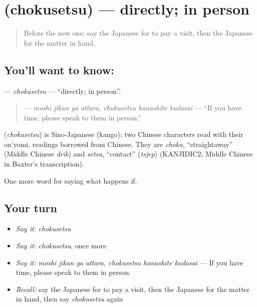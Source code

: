 \section[\texorpdfstring{\ja{ちょくせつ} (chokusetsu)}{ちょくせつ (chokusetsu)}]{ (chokusetsu) — directly; in person}

\label{lesson:JA-C347-chokusetsu}



\begin{quote}
Before the new one: say the Japanese for to pay a visit, then the Japanese for the matter in hand.
\end{quote}

\subsection*{You'll want to know: }
\textbf{} — \emph{chokusetsu} — \textquotedblleft{}directly; in person\textquotedblright{}.

\begin{quote}
\textbf{    } — \emph{moshi jikan ga attara, chokusetsu hanashite kudasai} — \textquotedblleft{}If you have time, please speak to them in person.\textquotedblright{}
\end{quote}

\begin{cousinweb}
\textbf{} (\emph{chokusetsu}) is Sino-Japanese (kango): two Chinese characters read with their on'yomi, readings borrowed from Chinese. They are \emph{choku}, \textquotedblleft{}straightaway\textquotedblright{} (Middle Chinese \emph{drik}) and \emph{setsu}, \textquotedblleft{}contact\textquotedblright{} (\emph{tsjep}) (KANJIDIC2; Middle Chinese in Baxter's transcription).
\end{cousinweb}

\begin{grammarlens}[title={What you've built}]
One more word for saying what happens if.
\end{grammarlens}

\subsection*{Your turn}
\begin{itemize}
\raggedright
  \item \emph{Say it:} \emph{chokusetsu}
  \item \emph{Say it:} \emph{chokusetsu}, once more
  \item \emph{Say it:} \emph{moshi jikan ga attara, chokusetsu hanashite kudasai} — If you have time, please speak to them in person.
  \item \emph{Recall:} say the Japanese for to pay a visit, then the Japanese for the matter in hand, then say \emph{chokusetsu} again
\end{itemize}


